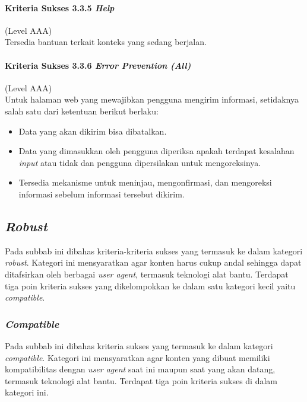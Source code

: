 \paragraph{Kriteria Sukses 3.3.5 \textit{Help}}
\label{sec:kriteria_sukses_3.3.5}
(Level AAA)\\

Tersedia bantuan terkait konteks yang sedang berjalan.

\paragraph{Kriteria Sukses 3.3.6 \textit{Error Prevention (All)}}
\label{sec:kriteria_sukses_3.3.6}
(Level AAA)\\

Untuk halaman web yang mewajibkan pengguna mengirim informasi, setidaknya salah satu dari ketentuan berikut berlaku:
\begin{itemize}
	\item Data yang akan dikirim bisa dibatalkan.
	\item Data yang dimasukkan oleh pengguna diperiksa apakah terdapat kesalahan \textit{input} atau tidak dan pengguna dipersilakan untuk mengoreksinya.
	\item Tersedia mekanisme untuk meninjau, mengonfirmasi, dan mengoreksi informasi sebelum informasi tersebut dikirim.
\end{itemize}


\subsection{\textit{Robust}}
\label{sec:robust}
Pada subbab ini dibahas kriteria-kriteria sukses yang termasuk ke dalam kategori \textit{robust}. Kategori ini mensyaratkan agar konten harus cukup andal sehingga dapat ditafsirkan oleh berbagai \textit{user agent}, termasuk teknologi alat bantu. Terdapat tiga poin kriteria sukses yang dikelompokkan ke dalam satu kategori kecil yaitu \textit{compatible}.

\subsubsection{\textit{Compatible}}
\label{sec:compatible}
Pada subbab ini dibahas kriteria sukses yang termasuk ke dalam kategori \textit{compatible}. Kategori ini mensyaratkan agar konten yang dibuat memiliki kompatibilitas dengan \textit{user agent} saat ini maupun saat yang akan datang, termasuk teknologi alat bantu. Terdapat tiga poin kriteria sukses di dalam kategori ini.

